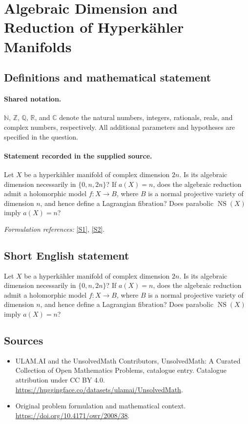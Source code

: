 \documentclass[11pt]{article}
\newcommand{\sref}[2]{\hyperlink{source:#1:#2}{[S#2]}}
\begin{document}
\section{Algebraic Dimension and Reduction of Hyperkähler Manifolds}\label{statement}

\subsection{Definitions and mathematical statement}

\paragraph{Shared notation.}$\mathbb N$, $\mathbb Z$, $\mathbb Q$, $\mathbb R$, and $\mathbb C$ denote the natural numbers, integers, rationals, reals, and complex numbers, respectively. All additional parameters and hypotheses are specified in the question.


\paragraph{Statement recorded in the supplied source.}
Let $X$ be a hyperkähler manifold of complex dimension $2n$. Is its algebraic dimension necessarily in $\{0,n,2n\}$? If $a(X)=n$, does the algebraic reduction admit a holomorphic model $f:X\to B$, where $B$ is a normal projective variety of dimension $n$, and hence define a Lagrangian fibration? Does parabolic $\operatorname{NS}(X)$ imply $a(X)=n$?
\par\smallskip\textit{Formulation references:} \sref{statement}{1}, \sref{statement}{2}.
\subsection{Short English statement}
Let $X$ be a hyperkähler manifold of complex dimension $2n$. Is its algebraic dimension necessarily in $\{0,n,2n\}$? If $a(X)=n$, does the algebraic reduction admit a holomorphic model $f:X\to B$, where $B$ is a normal projective variety of dimension $n$, and hence define a Lagrangian fibration? Does parabolic $\operatorname{NS}(X)$ imply $a(X)=n$?
\subsection{Sources}
\begin{itemize}
\item[\hypertarget{source:statement:1}{S1}] ULAM.AI and the UnsolvedMath Contributors, UnsolvedMath: A Curated Collection of Open Mathematics Problems, catalogue entry. Catalogue attribution under CC BY 4.0.
\url{https://huggingface.co/datasets/ulamai/UnsolvedMath}.
\item[\hypertarget{source:statement:2}{S2}] Original problem formulation and mathematical context.
\url{https://doi.org/10.4171/owr/2008/38}.
\end{itemize}
\label{end:statement}
\end{document}
